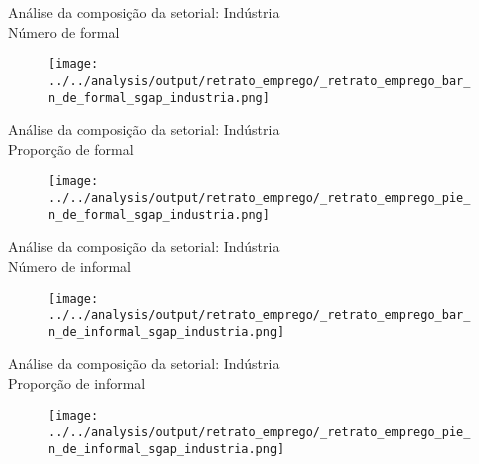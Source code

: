 \begin{frame}[label=_retrato_emprego_bar_n_de_formal_sgap_industria]{{\small Análise da composição da setorial: Indústria \\  Número de formal}}
\textit{\hyperlink{_retrato_emprego_sgap_industria}{}}
\begin{figure}
  \centering
  \texttt{[image: ../../analysis/output/retrato\_emprego/\_retrato\_emprego\_bar\_n\_de\_formal\_sgap\_industria.png]}
  \caption{}
  \label{fig:_retrato_emprego_bar_n_de_formal_sgap_industria}
\end{figure}
\end{frame}



\begin{frame}[label=_retrato_emprego_pie_n_de_formal_sgap_industria]{{\small Análise da composição da setorial: Indústria \\  Proporção de formal}}
\textit{\hyperlink{_retrato_emprego_sgap_industria}{}}
\begin{figure}
  \centering
  \texttt{[image: ../../analysis/output/retrato\_emprego/\_retrato\_emprego\_pie\_n\_de\_formal\_sgap\_industria.png]}
  \caption{}
  \label{fig:_retrato_emprego_pie_n_de_formal_sgap_industria}
\end{figure}
\end{frame}


\begin{frame}[label=_retrato_emprego_bar_n_de_informal_sgap_industria]{{\small Análise da composição da setorial: Indústria \\  Número de informal}}
\textit{\hyperlink{_retrato_emprego_sgap_industria}{}}
\begin{figure}
  \centering
  \texttt{[image: ../../analysis/output/retrato\_emprego/\_retrato\_emprego\_bar\_n\_de\_informal\_sgap\_industria.png]}
  \caption{}
  \label{fig:_retrato_emprego_bar_n_de_informal_sgap_industria}
\end{figure}
\end{frame}


\begin{frame}[label=_retrato_emprego_pie_n_de_informal_sgap_industria]{{\small Análise da composição da setorial: Indústria \\  Proporção de informal}}
\textit{\hyperlink{_retrato_emprego_sgap_industria}{}}
\begin{figure}
  \centering
  \texttt{[image: ../../analysis/output/retrato\_emprego/\_retrato\_emprego\_pie\_n\_de\_informal\_sgap\_industria.png]}
  \caption{}
  \label{fig:_retrato_emprego_pie_n_de_informal_sgap_industria}
\end{figure}
\end{frame}

